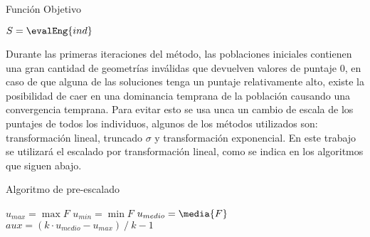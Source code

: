\begin{algorithm} \caption{Función Objetivo}\label{algo:funcion_objetivo}
  \BlankLine

  $S = \evalEng{ind}$\;
  \;
\end{algorithm}


Durante las primeras iteraciones del método, las poblaciones iniciales contienen
una gran cantidad de geometrías inválidas que devuelven valores de puntaje 0, en
caso de que alguna de las soluciones tenga un puntaje relativamente alto, existe
la posibilidad de caer en una dominancia temprana de la población causando una
convergencia temprana.
%
Para evitar esto se usa unca un cambio de escala de los puntajes de todos los
individuos, algunos de los métodos utilizados son: transformación lineal,
truncado $\sigma$ y transformación exponencial.
%
En este trabajo se utilizará el escalado por transformación lineal, como se
indica en los algoritmos que siguen abajo.

\begin{algorithm} \caption{Algoritmo de pre-escalado}\label{algo:pre-escala}
  \BlankLine

  $u_{max} = \max{F}$\;
  $u_{min} = \min{F}$\;
  $u_{medio} = \media{F}$\;
  $aux = (k\cdot u_{medio} - u_{max}) \mathbin{/} k-1$\;
\end{algorithm}


